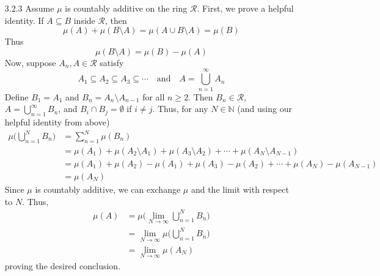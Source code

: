 \documentclass[../../Solutions.tex]{subfiles}
\begin{document}
\begin{itemize}
	\item [3.2.3] Assume $\mu$ is countably additive on the ring $\mathcal{R}$.
		First, we prove a helpful identity.
		If $A \subseteq B$ inside $\mathcal{R}$, then
		$$ \mu(A) + \mu(B\setminus A) = \mu(A \cup B\setminus A) = \mu(B) $$
		Thus
		$$ \mu(B\setminus A) = \mu(B) - \mu(A) $$
		Now, suppose $A_n, A \in \mathcal{R}$ satisfy
		$$ A_1 \subseteq A_2 \subseteq A_3 \subseteq \cdots \quad\text{and}\quad A = \bigcup_{n=1}^\infty A_n $$
		Define $B_1 = A_1$ and $B_n = A_n \setminus A_{n-1}$ for all $n \geq 2$.
		Then $B_n \in \mathcal{R}$, $A = \bigcup_{n=1}^\infty B_n$, and $B_i \cap B_j = \emptyset$ if $i \neq j$.
		Thus, for any $N \in \mathbb{N}$ (and using our helpful identity from above)
		\begin{equation*} \begin{split}
			\mu\Big(\bigcup_{n=1}^N B_n\Big) & = \sum_{n=1}^N \mu(B_n) \\
				& = \mu(A_1) + \mu(A_2 \setminus A_1) + \mu(A_3 \setminus A_2) + \cdots + \mu(A_N\setminus A_{N-1}) \\
				& = \mu(A_1) + \mu(A_2) - \mu(A_1) + \mu(A_3) - \mu(A_2) + \cdots + \mu(A_N) - \mu(A_{N-1}) \\
				& = \mu(A_N)
		\end{split} \end{equation*}
		Since $\mu$ is countably additive, we can exchange $\mu$ and the limit with respect to $N$.
		Thus,
		\begin{equation*} \begin{split}
			\mu(A) & = \mu\Big(\lim_{N\to\infty}\bigcup_{n=1}^N B_n\Big) \\
				& = \lim_{N\to\infty}\mu\Big(\bigcup_{n=1}^N B_n\Big) \\
				& = \lim_{N\to\infty}\mu(A_N)
		\end{split} \end{equation*}
		proving the desired conclusion.
	
\end{itemize}
\end{document}

